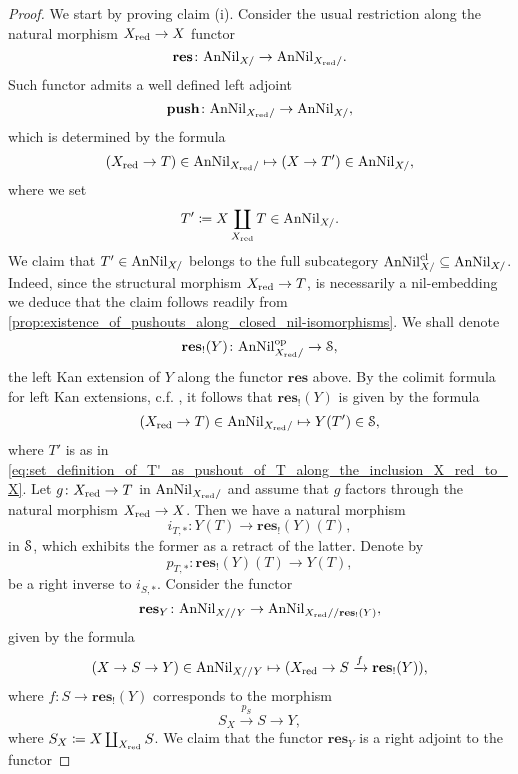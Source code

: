 \documentclass[10pt,a4paper,reqno]{amsart} %
\theoremstyle{plain}
\theoremstyle{definition}
\theoremstyle{remark}
\numberwithin{equation}{section}
\begin{document}
\begin{proof}
    We start by proving claim (i). Consider the usual restriction along the natural morphism $X_{\mathrm{red}} \to X$ functor 
        \[\mathbf{res} \colon \mathrm{AnNil}_{X/} \to \mathrm{AnNil}_{X_{\mathrm{red}}/}.\]
    Such functor admits a well defined left adjoint
        \[\mathbf{push} \colon \mathrm{AnNil}_{X_{\mathrm{red}}/} \to \mathrm{AnNil}_{X/},\]
    which is determined by the formula
        \[
            (X_{\mathrm{red}} \to T) \in \mathrm{AnNil}_{X_{\mathrm{red}} /} \mapsto (X \to T') \in \mathrm{AnNil}_{X/},   
        \]
    where we set
        \begin{equation} \label{eq:set_definition_of_T'_as_pushout_of_T_along_the_inclusion_X_red_to_X}
            T' \coloneqq X \coprod_{X_{\mathrm{red}}} T \in \mathrm{AnNil}_{X/}.  
        \end{equation}
    We claim that $T' \in \mathrm{AnNil}_{X/}$ belongs to the full subcategory $\mathrm{AnNil}^{\mathrm{cl}}_{X/} \subseteq \mathrm{AnNil}_{X/}$.
    Indeed, since the structural morphism
        $X_{\mathrm{red}} \to T$,
    is necessarily a nil-embedding we deduce that the claim follows readily from \cref{prop:existence_of_pushouts_along_closed_nil-isomorphisms}.
    We shall denote
        \[
            \mathbf{res}_!(Y) \colon \mathrm{AnNil}^\mathrm{op}_{X_{\mathrm{red}} /} \to \mathcal S,
        \]
    the left Kan extension of $Y$ along the functor $\mathbf{res}$ above. By the colimit formula
    for left Kan extensions, c.f. \cite[Lemma 4.3.2.13]{HTT}, it follows that $\mathbf{res}_!(Y)$ is given by the formula
        \[
            (X_{\mathrm{red}} \to T) \in  \mathrm{AnNil}_{X_{\mathrm{red}} /} \mapsto Y(T') \in \mathcal S,
        \]
    where $T'$ is as in \eqref{eq:set_definition_of_T'_as_pushout_of_T_along_the_inclusion_X_red_to_X}.
    Let $g \colon X_{\mathrm{red}} \to T$ in $\mathrm{AnNil}_{X_{\mathrm{red}}/}$ and assume that $g$ factors through the natural morphism $X_{\mathrm{red}} \to X$. Then we have a natural morphism
        \[
           i_{T, *} \colon Y(T) \to \mathbf{res}_!(Y)(T) ,  
        \]
    in $\mathcal S$, which exhibits the former as a retract of the latter. Denote by
        \[
            p_{T, *} \colon \mathbf{res}_!(Y)(T) \to Y(T),  
        \]
    be a right inverse to $i_{S, *}$. Consider the functor
        \[
            \mathbf{res}_Y \colon \mathrm{AnNil}_{X//Y} \to \mathrm{AnNil}_{X_{\mathrm{red}} / /\mathbf{res}_!(Y)},  
        \]
    given by the formula
        \[
            (X \to S \to Y) \in \mathrm{AnNil}_{X//Y} \mapsto (X_{\mathrm{red}} \to S \xrightarrow{f} \mathbf{res}_!(Y)),  
        \]
    where $f \colon S \to \mathbf{res}_!(Y)$ corresponds to the morphism
        \[  
            S_X \xrightarrow{p_S} S \to Y,
        \]
    where $S_X \coloneqq X \coprod_{X_{\mathrm{red}}} S$. We claim that the functor $\mathbf{res}_Y$ is a right adjoint to the functor

\end{proof}
\end{document}
